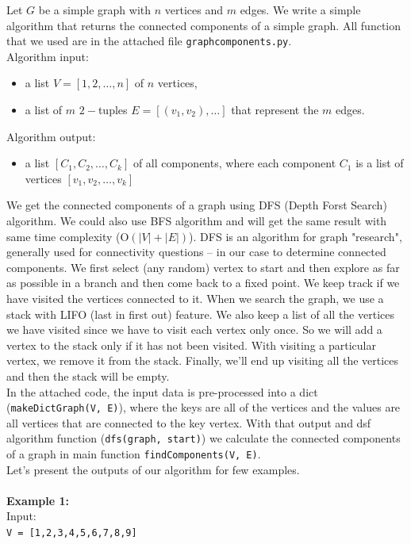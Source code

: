 \documentclass[a4paper,11pt]{article}
\begin{document}
Let $G$ be a simple graph with $n$ vertices and $m$ edges.
We write a simple algorithm that returns the connected components of a simple graph. 
All function that we used are in the attached file \texttt{graphcomponents.py}.
\\
Algorithm input: 
\begin{itemize}
    \item a list $ V = [1, 2, \ldots, n]$ of $n$ vertices,
    \item a list of $m$ $2-$tuples $E = [(v_1, v_2), \ldots]$ that represent the $m$ edges.
\end{itemize}
Algorithm output:
\begin{itemize}
    \item a list $[C_1, C_2, \ldots, C_k]$ of all components, where each component $C_1$ is a list of vertices $[v_1, v_2, \ldots, v_k]$
\end{itemize}
We get the connected components of a graph using DFS (Depth Forst Search) algorithm. We could also use BFS algorithm and will get the same result with same time complexity (O$\left( |V| + |E| \right) $).
DFS is an algorithm for graph "research", generally used for connectivity questions -- in our case to determine connected components. 
We first select (any random) vertex to start and then explore as far as possible in a branch and then come back to a fixed point. We keep track if we have visited the vertices connected to it. When we search the graph, we use a stack with LIFO (last in first out) feature.
We also keep a list of all the vertices we have visited since we have to visit each vertex only once.
So we will add a vertex to the stack only if it has not been visited. With visiting a particular vertex, we remove it from the stack. Finally, we'll end up visiting all the vertices and then the stack will be empty.
\\
In the attached code, the input data is pre-processed into a dict (\texttt{makeDictGraph(V, E)}), where the keys are all of the vertices and the values are all vertices that are connected to the key vertex. With that output and dsf algorithm function (\texttt{dfs(graph, start)}) 
we calculate the connected components of a graph in main function \texttt{findComponents(V, E)}.
\\
Let's present the outputs of our algorithm for few examples.
\\
\\
\textbf{Example 1:} \\
Input: \\
\texttt{V = [1,2,3,4,5,6,7,8,9]} \\
\end{document}
